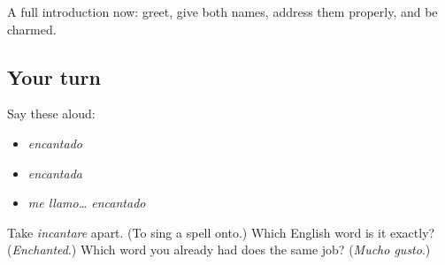\begin{grammarlens}[title={What you've built}]
A full introduction now: greet, give both names, address them properly, and be charmed.
\end{grammarlens}

\subsection*{Your turn}
Say these aloud:

\begin{itemize}
\raggedright
  \item \emph{encantado}
  \item \emph{encantada}
  \item \emph{me llamo… encantado}
\end{itemize}

\begin{tcolorbox}[breakable,colback=teal!4,colframe=teal!35!black,title={Before you move on}]
Take \emph{incantare} apart. (To sing a spell onto.) Which English word is it exactly? (\emph{Enchanted}.) Which word you already had does the same job? (\emph{Mucho gusto}.)
\end{tcolorbox}
